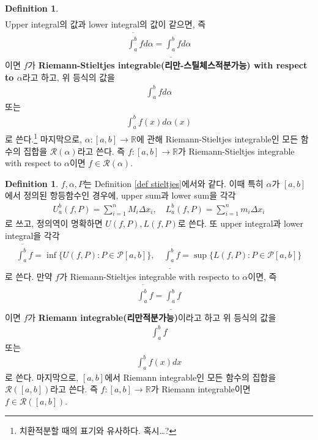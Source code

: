 \documentclass[12pt]{article}
\theoremstyle{definition}
\newtheorem{defn}[thm]{Definition}
\def\RR{\mathbb{R}}
\def\calR{\mathcal{R}}
\begin{document}
\begin{defn}
\begin{gather*}
	\end{gather*}
	Upper integral의 값과 lower integral의 값이 같으면, 즉
	\begin{gather*}
		\overline{\int_a^b} f d\alpha = \underline{\int_a^b} f d\alpha
	\end{gather*}
	이면 \(f\)가 \textbf{Riemann-Stieltjes integrable(리만-스틸체스적분가능) with respect to \(\alpha\)}라고 하고, 위 등식의 값을
	\begin{gather*}
		\int_a^b f d\alpha
	\end{gather*}
	또는
	\begin{gather*}
		\int_a^b f(x) d\alpha(x)
	\end{gather*}
	로 쓴다.\footnote{치환적분할 때의 표기와 유사하다. 혹시\ldots?} 마지막으로, \(\alpha: [a, b] \rightarrow \RR\)에 관해 Riemann-Stieltjes integrable인 모든 함수의 집합을 \(\calR(\alpha)\)라고 쓴다. 즉 \(f: [a, b] \rightarrow \RR\)가 Riemann-Stieltjes integrable with respect to \(\alpha\)이면 \(f \in \calR(\alpha)\).
\end{defn}

\begin{defn}
	\(f, \alpha, P\)는 Definition \ref{def stieltjes}에서와 같다. 이때 특히 \(\alpha\)가 \([a, b]\)에서 정의된 항등함수인 경우에, upper sum과 lower sum을 각각
	\begin{gather*}
		U_a^b (f, P) = \sum_{i=1}^n M_i \Delta x_i, \quad 	L_a^b (f, P) = \sum_{i=1}^n m_i \Delta x_i
	\end{gather*}
	로 쓰고, 정의역이 명확하면 \(U(f, P), L(f, P)\)로 쓴다. 또 upper integral과 lower integral을 각각
	\begin{gather*}
		\overline{\int_a^b} f = \inf \{U(f, P): P \in \mathcal{P}[a, b]\}, \quad \underline{\int_a^b} f = \sup \{L(f, P): P \in \mathcal{P}[a, b]\}
	\end{gather*}
	로 쓴다. 만약 \(f\)가 Riemann-Stieltjes integrable with respecto to \(\alpha\)이면, 즉
	\begin{gather*}
		\overline{\int_a^b} f = \underline{\int_a^b} f
	\end{gather*}
	이면 \(f\)가 \textbf{Riemann integrable(리만적분가능)}이라고 하고 위 등식의 값을
	\begin{gather*}
		\int_a^b f
	\end{gather*}
	또는
	\begin{gather*}
		\int_a^b f(x) dx
	\end{gather*}
	로 쓴다. 마지막으로, \([a, b]\)에서 Riemann integrable인 모든 함수의 집합을 \(\calR([a, b])\)라고 쓴다. 즉 \(f: [a, b] \rightarrow \RR\)가 Riemann integrable이면 \(f \in \calR([a, b])\).
\end{defn}
\end{document}
